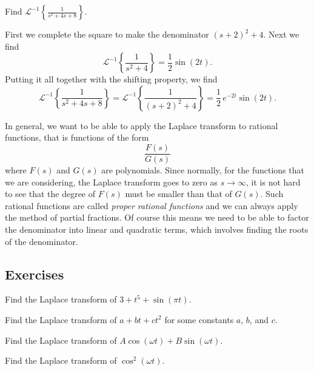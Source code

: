 \begin{example}
Find
${\mathcal{L}}^{-1} \left\{ \frac{1}{s^2+4s+8} \right\}$.

First we complete the square to make the denominator ${(s+2)}^2+4$.  
Next we find
\begin{equation*}
{\mathcal{L}}^{-1} \left\{ \frac{1}{s^2+4} \right\}
=
\frac{1}{2} \sin (2t) .
\end{equation*}
Putting it all together with the shifting property, we find
\begin{equation*}
{\mathcal{L}}^{-1} \left\{ \frac{1}{s^2+4s+8} \right\} = 
{\mathcal{L}}^{-1} \left\{ \frac{1}{{(s+2)}^2+4} \right\}
=
\frac{1}{2}\,e^{-2t} \sin (2t) .
\end{equation*}
\end{example}

In general, we want to be able to apply the Laplace transform to
rational functions, that is functions of the form
\begin{equation*}
\frac{F(s)}{G(s)}
\end{equation*}
where $F(s)$ and $G(s)$ are polynomials.  Since normally, for the functions
that we are considering, the Laplace transform goes
to zero as $s \to \infty$, it is not hard to see that the degree of $F(s)$
must be smaller than that of $G(s)$.  Such rational functions
are called \emph{proper rational functions}
and we can always apply the method of partial fractions.  Of
course this means we need to be able to factor the denominator into
linear and quadratic terms, which involves finding the roots of the
denominator.

\subsection{Exercises}

\begin{exercise}
Find the Laplace transform of $3+t^5+\sin (\pi t)$.
\end{exercise}

\begin{exercise}
Find the Laplace transform of $a+bt+ct^2$ for some constants $a$, $b$, and
$c$.
\end{exercise}

\begin{exercise}
Find the Laplace transform of $A \cos (\omega t) + B \sin (\omega t)$.
\end{exercise}

\begin{exercise}
Find the Laplace transform of $\cos^2 (\omega t)$.
\end{exercise}

